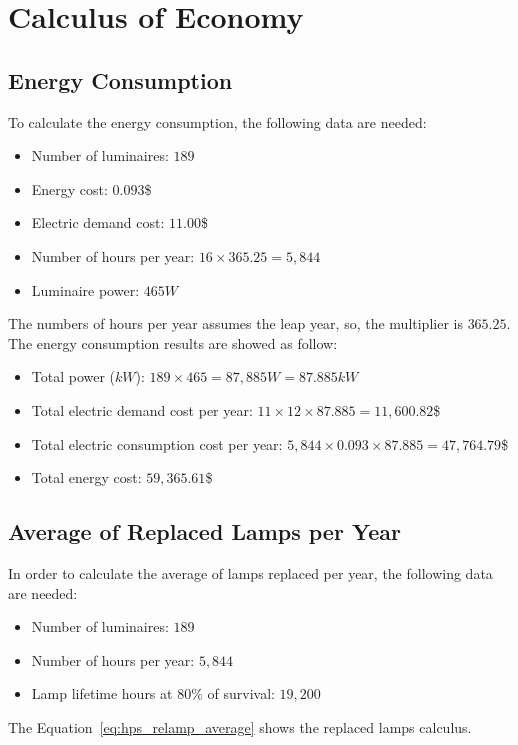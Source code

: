 \section{Calculus of Economy}

\subsection{Energy Consumption}
To calculate the energy consumption, the following data are needed:
\begin{itemize}
\item Number of luminaires: $189$
\item Energy cost: $0.093$\$
\item Electric demand cost: $11.00$\$
\item Number of hours per year: $16 \times 365.25 = 5,844$
\item Luminaire power: $465 W$
\end{itemize}
The numbers of hours per year assumes the leap year, so, the multiplier is $365.25$. The energy consumption results are showed as follow:
\begin{itemize}
\item Total power ($kW$): $189 \times 465 = 87,885 W = 87.885 kW$
\item Total electric demand cost per year: $11 \times 12 \times 87.885 = 11,600.82$\$
\item Total electric consumption cost per year: $5,844 \times 0.093 \times 87.885 = 47,764.79$\$
\item Total energy cost: $59,365.61$\$
\end{itemize}

\subsection{Average of Replaced Lamps per Year}
In order to calculate the average of lamps replaced per year, the following data are needed:
\begin{itemize}
\item Number of luminaires: $189$
\item Number of hours per year: $5,844$
\item Lamp lifetime hours at $80\%$ of survival: $19,200$
\end{itemize}

The Equation~\ref{eq:hps_relamp_average} shows the replaced lamps calculus.

